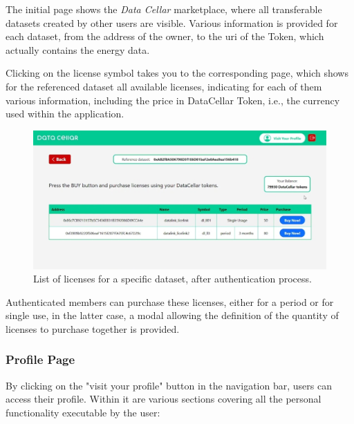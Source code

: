 The initial page shows the \textit{Data Cellar} marketplace, where all transferable datasets created by other users are visible. Various information is provided for each dataset, 
from the address of the owner, to the \gls{uri} of the Token, which actually contains the energy data.

Clicking on the license symbol takes you to the corresponding page, which shows for the referenced dataset all available licenses, indicating for each of them various 
information, including the price in DataCellar Token, i.e., the currency used within the application. 

\begin{figure}[h]  
  \centering
  \includegraphics[width=1\textwidth]{Images/c6_5.jpg} 
  \caption{List of licenses for a specific dataset, after authentication process.}
\end{figure}

Authenticated members can purchase these licenses, either for a period or for single use, in the latter case, a modal allowing the definition of the quantity of licenses to
purchase together is provided.

\subsubsection{Profile Page}

By clicking on the "visit your profile" button in the navigation bar, users can access their profile. Within it are various sections covering all the personal functionality 
executable by the user:

\newpage

